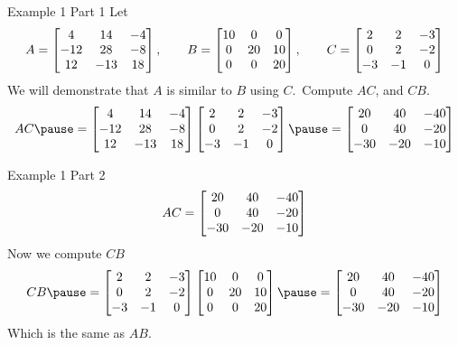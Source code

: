 \documentclass[xcoler=dvipsnames, aspectratio=169]{beamer}
\date{Similarity Practice}
\begin{document}
    \begin{frame}{Example 1 Part 1}
        Let 
        \[
            A = \begin{bmatrix}
                4   & 14 & -4\\
                -12 & 28 & -8\\
                12  & -13& 18
            \end{bmatrix}, \qquad B=\begin{bmatrix}
                10 & 0 & 0\\
                0 & 20 &10\\
                0 & 0 & 20
            \end{bmatrix}, \qquad C=\begin{bmatrix}
                2 & 2 & -3\\
                0 & 2 & -2\\
                -3&-1 & 0
            \end{bmatrix}
        \]
        We will demonstrate that $A$ is similar to $B$ using $C$.\pause\ Compute $AC$, and $CB$.
        \[
            AC\pause = \bMat{
                4   & 14 & -4\\
                -12 & 28 & -8\\
                12  & -13& 18
            }\bMat{
                2 & 2 & -3\\
                0 & 2 & -2\\
                -3&-1 & 0
            } \pause = \bMat{
                20  & 40 & -40\\
                0   & 40 & -20\\
                -30 &-20 & -10
            }
        \]
    \end{frame}
    \begin{frame}{Example 1 Part 2}
        \[
            AC = \begin{bmatrix}
                20  & 40 & -40\\
                0   & 40 & -20\\
                -30 &-20 & -10
            \end{bmatrix}
        \]\pause
        Now we compute $CB$
        \[
            CB\pause = \bMat{
                2 & 2 & -3\\
                0 & 2 & -2\\
                -3&-1 & 0
            }\bMat{
                10 & 0 & 0\\
                0 & 20 & 10\\
                0 & 0 & 20
            }\pause = \bMat{
                20  & 40 & -40\\
                0   & 40 & -20\\
                -30 &-20 & -10
            }
        \]\pause
        Which is the same as $AB$.
    \end{frame}
\end{document}
